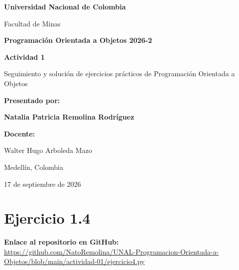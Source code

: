 \documentclass[11pt, a4paper]{article}
\begin{document}
\begin{titlepage}
    \centering
    \vspace*{1cm}

    {\huge \textbf{Universidad Nacional de Colombia}\par}
    \vspace{0.5cm}
    {\Large Facultad de Minas\par}
    \vspace{1.5cm}

    {\Large \textbf{Programación Orientada a Objetos 2026-2}\par}
    \vspace{2cm}

    {\huge \textbf{Actividad 1}\par}
    \vspace{0.5cm}
    {\large Seguimiento y solución de ejercicios prácticos de Programación Orientada a Objetos\par}

    \vspace{3cm}

    \textbf{Presentado por:}\par
    \vspace{0.5cm}
    {\Large \textbf{Natalia Patricia Remolina Rodríguez}\par}

    \vspace{2cm}

    \textbf{Docente:}\par
    Walter Hugo Arboleda Mazo\par

    \vspace{2cm}

    Medellín, Colombia\par
    17 de septiembre de 2026
\end{titlepage}

\section{Ejercicio 1.4}

\noindent \textbf{Enlace al repositorio en GitHub:} \\
\url{https://github.com/NatoRemolina/UNAL-Programacion-Orientada-a-Objetos/blob/main/actividad-01/ejercicio4.py}
\end{document}
